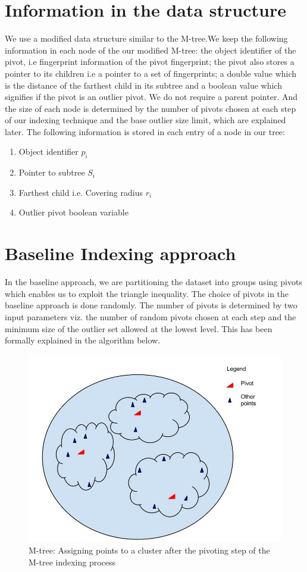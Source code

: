 \section{Information in the data structure}

We use a modified data structure similar to the M-tree.We keep the following information in each node of the our modified M-tree: the object identifier of the pivot, i.e fingerprint information of the pivot fingerprint; the pivot also stores a pointer to its children i.e a pointer to a set of fingerprints; a double value which is the distance of the farthest child in its subtree and a boolean value which signifies if the pivot is an outlier pivot. We do not require a parent pointer. And the size of each node is determined by the number of pivots chosen at each step of our indexing technique and the base outlier size limit, which are explained later. The following information is stored in each entry of a node in our tree:

\begin{enumerate}
	\item Object identifier $p_i$
	\item Pointer to subtree $S_i$
	\item Farthest child i.e. Covering radius $r_i$
	\item Outlier pivot boolean variable
\end{enumerate}

\section{Baseline Indexing approach}
In the baseline approach, we are partitioning the dataset into groups using pivots which enables us to exploit the triangle inequality. The choice of pivots in the baseline approach is done randomly. The number of pivots is determined by two input parameters viz. the number of random pivots chosen at each step and the minimum size of the outlier set allowed at the lowest level. This has been formally explained in the algorithm below. \\

\begin{figure}[ht]	
\centering
\includegraphics[width=0.7 \columnwidth]{img/image0a.jpg}
\caption{M-tree: Assigning points to a cluster after the pivoting step of the M-tree indexing process}
\label{fig:4.1}
\end{figure}

